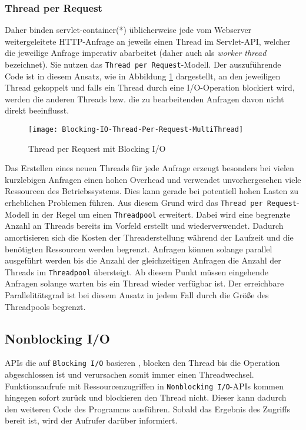 \subsubsection{Thread per Request}
\label{subsubsec:thread per request}
Daher binden \Gls{servlet-container}(*) üblicherweise jede vom Webserver weitergeleitete HTTP-Anfrage an jeweils einen
Thread im Servlet-API, welcher die jeweilige Anfrage imperativ abarbeitet
(daher auch als \textit{worker thread} bezeichnet). Sie nutzen das \verb|Thread per Request|-Modell.
Der auszuführende Code ist in diesem Ansatz, wie in Abbildung \ref{fig:blocking_thread_per_request} dargestellt,
an den jeweiligen Thread gekoppelt und falls ein Thread durch eine I/O-Operation blockiert wird, werden
die anderen Threads bzw. die zu bearbeitenden Anfragen davon nicht direkt beeinflusst.
\begin{figure}[ht!]
  \centering
  \texttt{[image: Blocking-IO-Thread-Per-Request-MultiThread]}
  \caption{Thread per Request mit Blocking I/O}
  \label{fig:blocking_thread_per_request}
\end{figure}

Das Erstellen eines neuen Threads für jede Anfrage erzeugt besonders bei vielen kurzlebigen Anfragen einen hohen Overhead und
verwendet unvorhergesehen viele Ressourcen des Betriebssystems. Dies kann gerade bei potentiell hohen Lasten zu erheblichen Problemen
führen.
Aus diesem Grund wird das \verb|Thread per Request|-Modell in der Regel um einen \verb|Threadpool| erweitert.
Dabei wird eine begrenzte Anzahl an Threads bereits im Vorfeld erstellt und wiederverwendet.
Dadurch amortisieren sich die Kosten der Threaderstellung während der Laufzeit und die benötigten Ressourcen werden begrenzt.
Anfragen können solange parallel ausgeführt werden bis die Anzahl der gleichzeitigen Anfragen die Anzahl der Threads im \verb|Threadpool|
übersteigt.
Ab diesem Punkt müssen eingehende Anfragen solange warten bis ein Thread wieder verfügbar ist.
Der erreichbare Parallelitätsgrad ist bei diesem Ansatz in jedem Fall durch die Größe des Threadpools begrenzt.
\newpage
\subsection{Nonblocking I/O}
\label{subsec:nonblocking-i/o}
APIs die auf \verb|Blocking I/O| basieren , blocken den Thread bis die Operation abgeschlossen ist und verursachen somit
immer einen Threadwechsel.
Funktionsaufrufe mit Ressourcenzugriffen in \verb|Nonblocking I/O|-APIs kommen hingegen sofort zurück und blockieren den Thread nicht.
Dieser kann dadurch den weiteren Code des Programms ausführen.
Sobald das Ergebnis des Zugriffs bereit ist, wird der Aufrufer darüber informiert.

